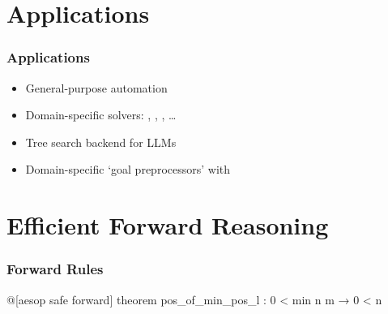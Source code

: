\section{Applications}

\begin{frame}
  \frametitle{Applications}

  \begin{itemize}[<+->]
    \item General-purpose automation
    \item Domain-specific solvers: , , , \dots
    \item Tree search backend for LLMs
    \item Domain-specific \enquote*{goal preprocessors} with 
  \end{itemize}
\end{frame}

\section{Efficient Forward Reasoning}

\begin{frame}[fragile]
  \frametitle{Forward Rules}

  \begin{leancode}
    @[aesop safe forward]
    theorem pos_of_min_pos_l : 0 < min n m → 0 < n
  \end{leancode}

  \begin{tcolorbox}
    \begin{center}
    \end{center}
  \end{tcolorbox}
\end{frame}

